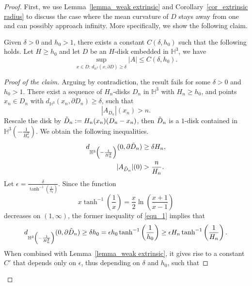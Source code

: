 \documentclass[10pt,a4paper]{amsart}
\begin{document}
\begin{proof}
First, we use Lemma~\ref{lemma_weak extrinsic} and Corollary~\ref{cor_extrinsic radius} to discuss the case where the mean curvature of $D$ stays away from one and can possibly approach infinity. More specifically, we show the following claim.
\begin{Claim}
    Given $\delta>0$ and $h_0>1$, there exists a constant $C(\delta,h_0)$ such that the following holds. Let $H\geq h_0$ and let $D$ be an $H$-disk embedded in $\mathbb{H}^3$, we have \begin{equation*}
       \sup_{x\in D: \,d_{\mathbb{H}^3}(x,\partial D)\geq \delta}|A|\leq C(\delta,h_0).
   \end{equation*}
\end{Claim}

\begin{proof}[Proof of the claim]
     Arguing by contradiction, the result fails for some $\delta>0$ and $h_0>1$. There exist a sequence of $H_n$-disks $D_n$ in $\mathbb{H}^3$ with $H_n\geq h_0$, and points $x_n\in D_n$ with $d_{\mathbb{H}^3}(x_n,\partial D_n)\geq \delta$, such that \begin{equation}\label{equ_assump_ext_2}
        |A_{D_n}|(x_n)>n.
    \end{equation}
    Rescale the disk by $\Tilde{D}_n:=H_n(x_n)(D_n-x_n)$, then $\Tilde{D}_n$ is a $1$-disk contained in $\mathbb{H}^3\left(-\frac{1}{H_n^2}\right)$. We obtain the following inequalities. \begin{align}\label{equ_1}
         d_{\mathbb{H}^3\left(-\frac{1}{H_n^2}\right)}(0,\partial\Tilde{D}_n) &\geq \delta H_n,\\\nonumber
         |A_{\Tilde{D}_n}|(0)&>\frac{n}{H_n}.
    \end{align}
Let $\epsilon=\frac{\delta}{\tanh^{-1}\left(\frac{1}{h_0}\right)}$. Since the function \begin{equation*}
    x\tanh^{-1}\left(\frac{1}{x}\right)=\frac{x}{2}\ln\left(\frac{x+1}{x-1}\right)
\end{equation*}
decreases on $(1,\infty)$,
the former inequality of \eqref{equ_1} implies that \begin{equation*}
    d_{\mathbb{H}^3\left(-\frac{1}{H_n^2}\right)}(0,\partial\Tilde{D}_n)\geq \delta h_0=\epsilon h_0\tanh^{-1}\left(\frac{1}{h_0}\right)\geq \epsilon H_n\tanh^{-1}\left(\frac{1}{H_n}\right).
\end{equation*}
When combined with Lemma~\ref{lemma_weak extrinsic}, it gives rise to a constant $C'$ that depends only on $\epsilon$, thus depending on $\delta$ and $h_0$, such that 

\end{proof}
\end{proof}
\end{document}
